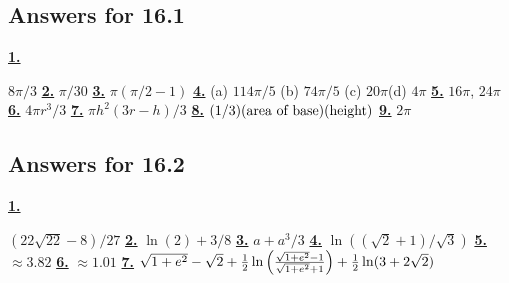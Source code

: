\subsection *{Answers for 16.1}
\hypertarget {a:16.1.1}{\hyperlink {e:16.1.1}{\bfseries 1.}} \mdseries $8\pi /3$\qquad 
\hypertarget {a:16.1.2}{\hyperlink {e:16.1.2}{\bfseries 2.}} \mdseries $\pi /30$\qquad 
\hypertarget {a:16.1.3}{\hyperlink {e:16.1.3}{\bfseries 3.}} \mdseries $\pi (\pi /2-1)$\qquad 
\hypertarget {a:16.1.4}{\hyperlink {e:16.1.4}{\bfseries 4.}} \mdseries (a) $114\pi /5$ (b) $74\pi /5$ (c) $20\pi $\hfill \break (d) $4\pi $\qquad 
\hypertarget {a:16.1.5}{\hyperlink {e:16.1.5}{\bfseries 5.}} \mdseries $16\pi $, $24\pi $\qquad 
\hypertarget {a:16.1.6}{\hyperlink {e:16.1.6}{\bfseries 6.}} \mdseries $4\pi r^3/3$\qquad 
\hypertarget {a:16.1.7}{\hyperlink {e:16.1.7}{\bfseries 7.}} \mdseries $\pi h^2(3r-h)/3$\qquad 
\hypertarget {a:16.1.8}{\hyperlink {e:16.1.8}{\bfseries 8.}} \mdseries $(1/3)(\hbox {area of base})(\hbox {height})$\qquad 
\hypertarget {a:16.1.9}{\hyperlink {e:16.1.9}{\bfseries 9.}} \mdseries $2\pi $\qquad 
\subsection *{Answers for 16.2}
\hypertarget {a:16.2.1}{\hyperlink {e:16.2.1}{\bfseries 1.}} \mdseries $(22\sqrt {22}-8)/27$\qquad 
\hypertarget {a:16.2.2}{\hyperlink {e:16.2.2}{\bfseries 2.}} \mdseries $\ln (2)+3/8$\qquad 
\hypertarget {a:16.2.3}{\hyperlink {e:16.2.3}{\bfseries 3.}} \mdseries $a+a^3/3$\qquad 
\hypertarget {a:16.2.4}{\hyperlink {e:16.2.4}{\bfseries 4.}} \mdseries $\ln ((\sqrt 2+1)/\sqrt 3)$\qquad 
\hypertarget {a:16.2.5}{\hyperlink {e:16.2.5}{\bfseries 5.}} \mdseries $\approx 3.82$\qquad 
\hypertarget {a:16.2.6}{\hyperlink {e:16.2.6}{\bfseries 6.}} \mdseries $\approx 1.01$\qquad 
\hypertarget {a:16.2.7}{\hyperlink {e:16.2.7}{\bfseries 7.}} \mdseries $\sqrt {1+e^2}-\sqrt 2+ {1\over 2}\ln \left ({\sqrt {1+e^2}-1\over \sqrt {1+e^2}+1}\right )+ {1\over 2}\ln (3+2\sqrt 2)$\qquad 
